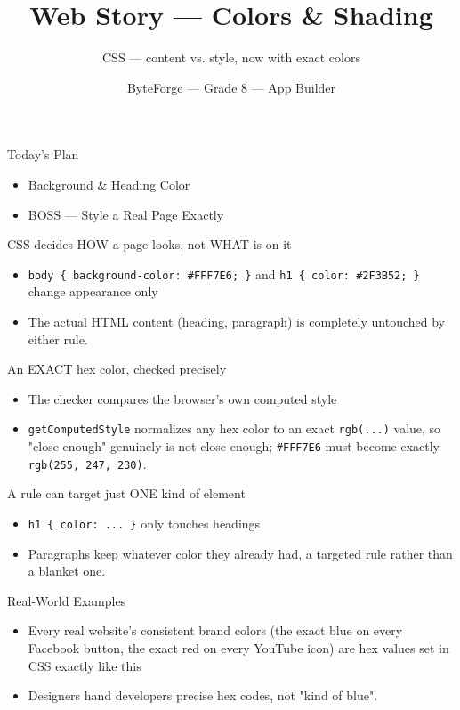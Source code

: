 \documentclass[aspectratio=169]{beamer}
\title{Web Story — Colors \& Shading}
\subtitle{CSS — content vs. style, now with exact colors}
\author{ByteForge --- Grade 8 --- App Builder}
\date{}
\begin{document}
\begin{frame}
    \titlepage
\end{frame}

\begin{frame}{Today's Plan}
    \begin{itemize}
        \item Background \& Heading Color
        \item[$\bigstar$] BOSS --- Style a Real Page Exactly
    \end{itemize}
\end{frame}

\begin{frame}{CSS decides HOW a page looks, not WHAT is on it}
    \large
    \begin{itemize}
        \item \texttt{body \{ background-color: \#FFF7E6; \}} and \texttt{h1 \{ color: \#2F3B52; \}} change appearance only
        \item The actual HTML content (heading, paragraph) is completely untouched by either rule.
    \end{itemize}
\end{frame}


\begin{frame}{An EXACT hex color, checked precisely}
    \large
    \begin{itemize}
        \item The checker compares the browser's own computed style
        \item \texttt{getComputedStyle} normalizes any hex color to an exact \texttt{rgb(...)} value, so "close enough" genuinely is not close enough; \texttt{\#FFF7E6} must become exactly \texttt{rgb(255, 247, 230)}.
    \end{itemize}
\end{frame}


\begin{frame}{A rule can target just ONE kind of element}
    \large
    \begin{itemize}
        \item \texttt{h1 \{ color: ... \}} only touches headings
        \item Paragraphs keep whatever color they already had, a targeted rule rather than a blanket one.
    \end{itemize}
\end{frame}

\begin{frame}{Real-World Examples}
    \large
    \begin{itemize}
        \item Every real website's consistent brand colors (the exact blue on every Facebook button, the exact red on every YouTube icon) are hex values set in CSS exactly like this
        \item Designers hand developers precise hex codes, not "kind of blue".
    \end{itemize}
\end{frame}
\end{document}
